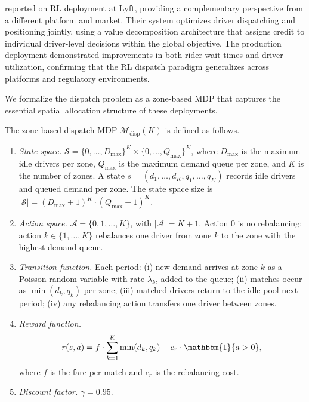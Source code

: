\citet{Han2022lyft} reported on RL deployment at Lyft, providing a complementary perspective from a different platform and market. Their system optimizes driver dispatching and positioning jointly, using a value decomposition architecture that assigns credit to individual driver-level decisions within the global objective. The production deployment demonstrated improvements in both rider wait times and driver utilization, confirming that the RL dispatch paradigm generalizes across platforms and regulatory environments.

We formalize the dispatch problem as a zone-based MDP that captures the essential spatial allocation structure of these deployments.

\begin{definition}
\label{def:dispatch_mdp}
The zone-based dispatch MDP $\mathcal{M}_{\mathrm{disp}}(K)$ is defined as follows.
\begin{enumerate}
    \item \emph{State space.} $\mathcal{S} = \{0, \ldots, D_{\max}\}^K \times \{0, \ldots, Q_{\max}\}^K$, where $D_{\max}$ is the maximum idle drivers per zone, $Q_{\max}$ is the maximum demand queue per zone, and $K$ is the number of zones. A state $s = (d_1, \ldots, d_K, q_1, \ldots, q_K)$ records idle drivers and queued demand per zone. The state space size is $|\mathcal{S}| = (D_{\max}+1)^K \cdot (Q_{\max}+1)^K$.
    \item \emph{Action space.} $\mathcal{A} = \{0, 1, \ldots, K\}$, with $|\mathcal{A}| = K + 1$. Action $0$ is no rebalancing; action $k \in \{1, \ldots, K\}$ rebalances one driver from zone $k$ to the zone with the highest demand queue.
    \item \emph{Transition function.} Each period: (i) new demand arrives at zone $k$ as a Poisson random variable with rate $\lambda_k$, added to the queue; (ii) matches occur as $\min(d_k, q_k)$ per zone; (iii) matched drivers return to the idle pool next period; (iv) any rebalancing action transfers one driver between zones.
    \item \emph{Reward function.}
    \begin{equation}
    \label{eq:dispatch_reward}
    r(s, a) = f \cdot \sum_{k=1}^{K} \min(d_k, q_k) - c_r \cdot \mathbbm{1}\{a > 0\},
    \end{equation}
    where $f$ is the fare per match and $c_r$ is the rebalancing cost.
    \item \emph{Discount factor.} $\gamma = 0.95$.
\end{enumerate}
\end{definition}

